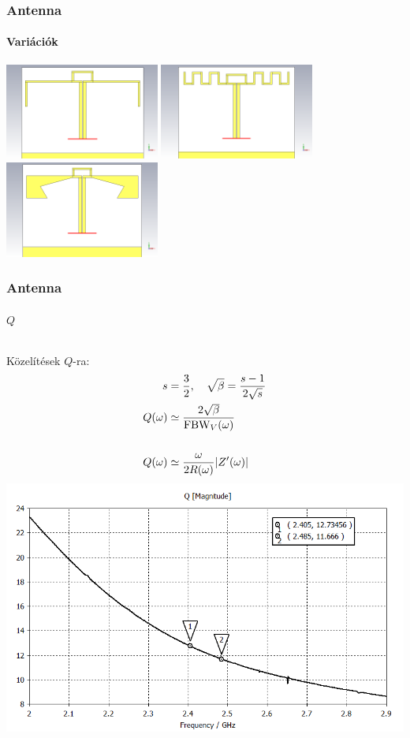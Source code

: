 \documentclass[aspectratio=43]{beamer}
\begin{document}
\begin{frame}
	\frametitle{Antenna}
	\framesubtitle{Variációk}
		\centering
		\includegraphics[width=0.38\textwidth]{bifa_3D.png}
		\includegraphics[width=0.38\textwidth]{bifa_meandered_3D.png}
		\includegraphics[width=0.38\textwidth]{bifa_broadband_3D.png}
\end{frame}
\begin{frame}
	\frametitle{Antenna}
	\framesubtitle{$Q$}
	\begin{columns}
			Közelítések $Q$-ra:\\
			\begin{align*}
				s & = \frac{3}{2}, \quad \sqrt{\beta} = \frac{s-1}{2\sqrt{s}} \\
				Q(\omega) & \simeq \frac{2 \sqrt{\beta}}{\text{FBW}_V(\omega)} \\
				\vspace{\fill}\\
				Q(\omega) & \simeq \frac{\omega}{2 R(\omega)}|Z'(\omega)|
			\end{align*}
			\includegraphics[width=\textwidth]{bifa_broadband_QZ.png}
	\end{columns}
\end{frame}
\end{document}
